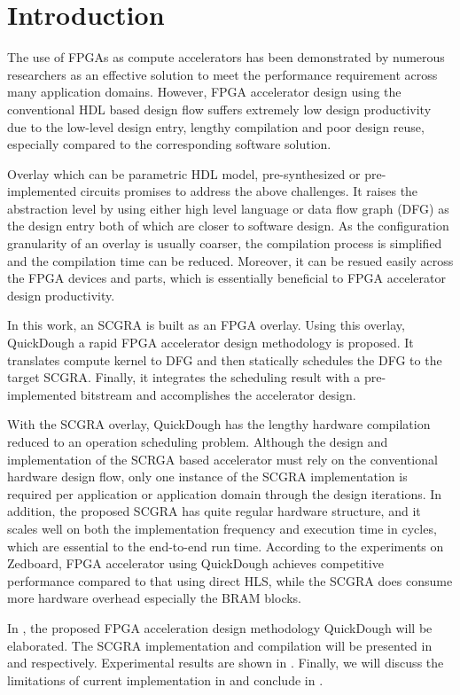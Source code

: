 \section{Introduction}\label{sec:introduction}
The use of FPGAs as compute accelerators has been demonstrated by numerous researchers as an effective solution to meet the performance requirement across many application domains. However, FPGA accelerator design using the conventional HDL based design flow suffers extremely low design productivity due to the low-level design entry, lengthy compilation and poor design reuse, especially compared to the corresponding software solution. 

Overlay which can be parametric HDL model, pre-synthesized or pre-implemented circuits promises to address the above challenges. It raises the abstraction level by using either high level language or data flow graph (DFG) as the design entry both of which are closer to software design. As the configuration granularity of an overlay is usually coarser, the compilation process is simplified and the compilation time can be reduced. Moreover, it can be resued easily across the FPGA devices and parts, which is essentially beneficial to FPGA accelerator design productivity.

In this work, an SCGRA is built as an FPGA overlay. Using this overlay, QuickDough a rapid FPGA accelerator design methodology is proposed. It translates compute kernel to DFG and then statically schedules the DFG to the target SCGRA. Finally, it integrates the scheduling result with a pre-implemented bitstream and accomplishes the accelerator design. 

With the SCGRA overlay, QuickDough has the lengthy hardware compilation reduced to an operation scheduling problem. Although the design and implementation of the SCRGA based accelerator must rely on the conventional hardware design flow, only one instance of the SCGRA implementation is required per application or application domain through the design iterations. In addition, the proposed SCGRA has quite regular hardware structure, and it scales well on both the implementation frequency and execution time in cycles, which are essential to the end-to-end run time. According to the experiments on Zedboard, FPGA accelerator using QuickDough achieves competitive performance compared to that using direct HLS, while the SCGRA does consume more hardware overhead especially the BRAM blocks. 

In , the proposed FPGA acceleration design methodology QuickDough will be elaborated. The SCGRA implementation and compilation will be presented in  and  respectively. Experimental results are shown in . Finally, we will discuss the limitations of current implementation in  and conclude in .


